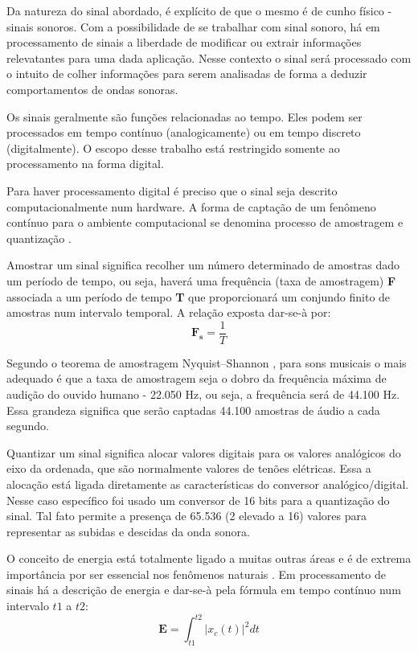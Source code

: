 Da natureza do sinal abordado, é explícito de que o mesmo é de cunho físico - sinais sonoros. Com a possibilidade de se trabalhar com sinal sonoro, há em processamento de sinais a liberdade de modificar ou extrair informações relevatantes para uma dada aplicação. Nesse contexto o sinal será processado com o intuito de colher informações para serem analisadas de forma a deduzir comportamentos de ondas sonoras.

Os sinais geralmente são funções relacionadas ao tempo. Eles podem ser processados em tempo contínuo (analogicamente) ou em tempo discreto (digitalmente). O escopo desse trabalho está restringido somente ao processamento na forma digital.

Para haver processamento digital é preciso que o sinal seja descrito computacionalmente num hardware. A forma de captação de um fenômeno contínuo para o ambiente computacional se denomina processo de amostragem e quantização \cite{amostragem}.

Amostrar um sinal significa recolher um número determinado de amostras dado um período de tempo, ou seja, haverá uma frequência (taxa de amostragem) \textbf{F} associada a um período de tempo \textbf{T} que proporcionará um conjundo finito de amostras num intervalo temporal. A relação exposta dar-se-à por:
\begin{equation}
\label{eqn05}
	\mathbf{F_s} = \frac{1}{T}
\end{equation}

Segundo o teorema de amostragem Nyquist–Shannon \cite{Nyquist}, para sons musicais o mais adequado é que a taxa de amostragem seja o dobro da frequência máxima de audição do ouvido humano - 22.050 Hz, ou seja, a frequência será de 44.100 Hz. Essa grandeza significa que serão captadas 44.100 amostras de áudio a cada segundo.

Quantizar um sinal significa alocar valores digitais para os valores analógicos do eixo da ordenada, que são normalmente valores de tenões elétricas. Essa a alocação está ligada diretamente as características do conversor analógico/digital. Nesse caso específico foi usado um conversor de 16 bits para a quantização do sinal. Tal fato permite a presença de 65.536 (2 elevado a 16) valores para representar as subidas e descidas da onda sonora.    

O conceito de energia está totalmente ligado a muitas outras áreas e é de extrema importância por ser essencial nos fenômenos naturais \cite{oppenheim}. Em processamento de sinais há a descrição de energia e dar-se-à pela fórmula em tempo contínuo num intervalo \textbf{$t1$} a \textbf{$t2$}: 
\begin{equation}
\label{eqn06}
	\mathbf{E} = \int_{t1}^{t2}{|x_c(t)|^{2}dt}
\end{equation}

